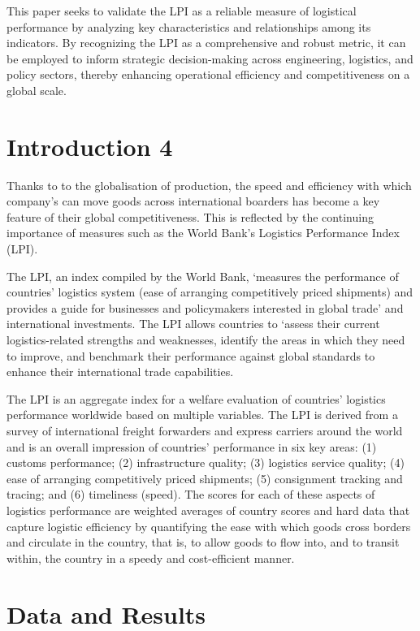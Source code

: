 \documentclass[sigconf]{acmart}
\begin{document}
This paper seeks to validate the LPI as a reliable measure of logistical performance by analyzing key characteristics and relationships among its indicators. By recognizing the LPI as a comprehensive and robust metric, it can be employed to inform strategic decision-making across engineering, logistics, and policy sectors, thereby enhancing operational efficiency and competitiveness on a global scale.

\section{Introduction 4}
Thanks to to the globalisation of production, the speed and efficiency with which company’s can move goods across international boarders has become a key feature of their global competitiveness. This is reflected by the continuing importance of measures such as the World Bank’s Logistics Performance Index (LPI).

The LPI, an index compiled by the World Bank, ‘measures the performance of countries’ logistics system (ease of arranging competitively priced shipments) and provides a guide for businesses and policymakers interested in global trade’ and international investments. The LPI allows countries to ‘assess their current logistics-related strengths and weaknesses, identify the areas in which they need to improve, and benchmark their performance against global standards to enhance their international trade capabilities.


The LPI is an aggregate index for a welfare evaluation of countries’ logistics performance worldwide based on multiple variables. The LPI is derived from a survey of international freight forwarders and express carriers around the world and is an overall impression of countries’ performance in six key areas: (1) customs performance; (2) infrastructure quality; (3) logistics service quality; (4) ease of arranging competitively priced shipments; (5) consignment tracking and tracing; and (6) timeliness (speed). The scores for each of these aspects of logistics performance are weighted averages of country scores and hard data that capture logistic efficiency by quantifying the ease with which goods cross borders and circulate in the country, that is, to allow goods to flow into, and to transit within, the country in a speedy and cost-efficient manner.


\section{Data and Results}
\end{document}
